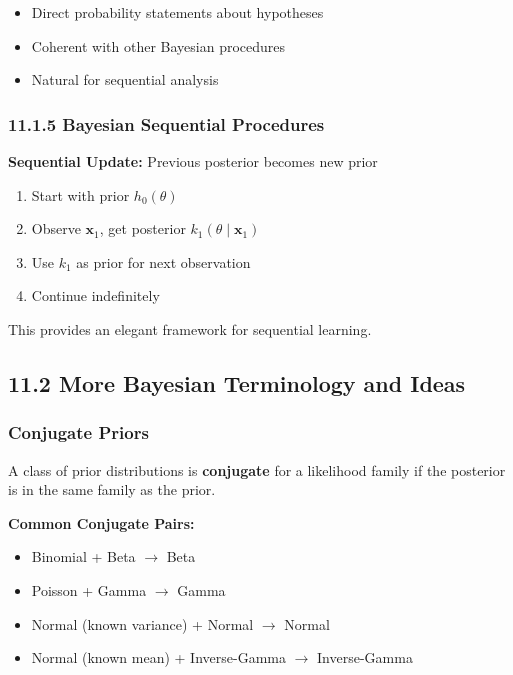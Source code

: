 \begin{itemize}
	\item Direct probability statements about hypotheses
	\item Coherent with other Bayesian procedures
	\item Natural for sequential analysis
\end{itemize}

\subsubsection{11.1.5 Bayesian Sequential Procedures}

\textbf{Sequential Update:} Previous posterior becomes new prior

\begin{enumerate}
	\item Start with prior $h_0(\theta)$
	\item Observe $\mathbf{x}_1$, get posterior $k_1(\theta \mid \mathbf{x}_1)$
	\item Use $k_1$ as prior for next observation
	\item Continue indefinitely
\end{enumerate}

This provides an elegant framework for sequential learning.

\subsection{11.2 More Bayesian Terminology and Ideas}

\subsubsection{Conjugate Priors}

\begin{definition}
A class of prior distributions is \textbf{conjugate} for a likelihood family if the posterior is in the same family as the prior.
\end{definition}
\textbf{Common Conjugate Pairs:}

\begin{itemize}
	\item Binomial + Beta $\to$ Beta
	\item Poisson + Gamma $\to$ Gamma
	\item Normal (known variance) + Normal $\to$ Normal
	\item Normal (known mean) + Inverse-Gamma $\to$ Inverse-Gamma
\end{itemize}

